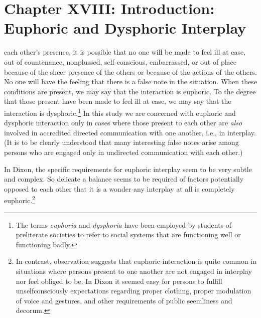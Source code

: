 \documentclass[twoside,symmetric,nobib,justified]{tufte-book}
\let\oldchapter\chapter
\def\chapter{%
  \setcounter{footnote}{0}%
  \oldchapter
}
\begin{document}
\chapter[CHAPTER XVIII: INTRODUCTION: EUPHORIC AND DYSPHORIC INTERPLAY]{Chapter XVIII: Introduction: Euphoric and Dysphoric Interplay}
\label{ch:Chapter XVIII: Introduction: Euphoric and Dysphoric Interplay}



 each other's presence, it is possible that no one
will be made to feel ill at ease, out of countenance, nonplussed,
self-conscious, embarrassed, or out of place because of the sheer
presence of the others or because of the actions of the others. No one
will have the feeling that there is a false note in the situation. When
these conditions are present, we may say that the interaction is
euphoric. To the degree that those present have been made to feel ill at
ease, we may say that the interaction is dysphoric.\footnote{The terms
  \emph{euphoria} and \emph{dysphoria} have been employed by students of
  preliterate societies to refer to social systems that are functioning
  well or functioning badly.} In this study we are concerned with
euphoric and dysphoric interaction only in cases where those present to
each other are \emph{also} involved in accredited directed communication
with one another, i.e., in interplay. (It is to be clearly understood
that many interesting false notes arise among persons who are engaged
only in undirected communication with each other.)

In Dixon, the specific requirements for euphoric interplay seem to be
very subtle and complex. So delicate a balance seems to be required of
factors potentially opposed to each other that it is a wonder any
interplay at all is completely euphoric.\footnote{In contrast,
  observation suggests that euphoric interaction is quite common in
  situations where persons present to one another are not engaged in
  interplay nor feel obliged to be. In Dixon it seemed easy for persons
  to fulfill unselfconsciously expectations regarding proper clothing,
  proper modulation of voice and gestures, and other requirements of
  public seemliness and decorum.}
\end{document}
